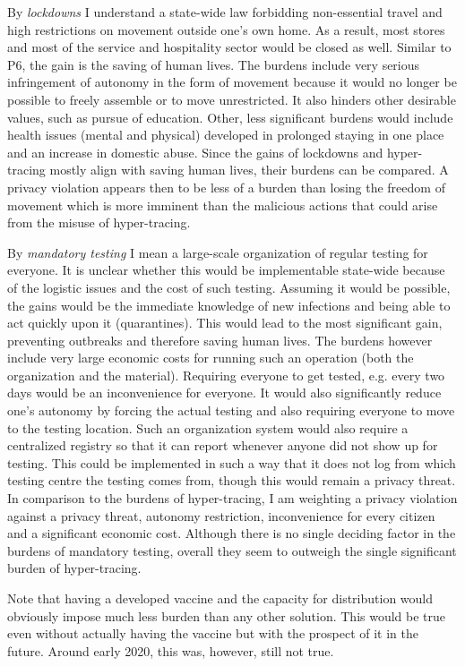By \emph{lockdowns} I understand a state-wide law forbidding non-essential travel and high restrictions on movement outside one's own home.
As a result, most stores and most of the service and hospitality sector would be closed as well.
Similar to P6, the gain is the saving of human lives.
The burdens include very serious infringement of autonomy in the form of movement because it would no longer be possible to freely assemble or to move unrestricted.
It also hinders other desirable values, such as pursue of education.
Other, less significant burdens would include health issues (mental and physical) developed in prolonged staying in one place and an increase in domestic abuse.
Since the gains of lockdowns and hyper-tracing mostly align with saving human lives, their burdens can be compared.
A privacy violation appears then to be less of a burden than losing the freedom of movement which is more imminent than the malicious actions that could arise from the misuse of hyper-tracing.

By \emph{mandatory testing} I mean a large-scale organization of regular testing for everyone.
It is unclear whether this would be implementable state-wide because of the logistic issues and the cost of such testing.
Assuming it would be possible, the gains would be the immediate knowledge of new infections and being able to act quickly upon it (quarantines).
This would lead to the most significant gain, preventing outbreaks and therefore saving human lives.
The burdens however include very large economic costs for running such an operation (both the organization and the material).
Requiring everyone to get tested, e.g. every two days would be an inconvenience for everyone.
It would also significantly reduce one's autonomy by forcing the actual testing and also requiring everyone to move to the testing location.
Such an organization system would also require a centralized registry so that it can report whenever anyone did not show up for testing.
This could be implemented in such a way that it does not log from which testing centre the testing comes from, though this would remain a privacy threat.
In comparison to the burdens of hyper-tracing, I am weighting a privacy violation against a privacy threat, autonomy restriction, inconvenience for every citizen and a significant economic cost.
Although there is no single deciding factor in the burdens of mandatory testing, overall they seem to outweigh the single significant burden of hyper-tracing.

Note that having a developed vaccine and the capacity for distribution would obviously impose much less burden than any other solution.
This would be true even without actually having the vaccine but with the prospect of it in the future.
Around early 2020, this was, however, still not true.

